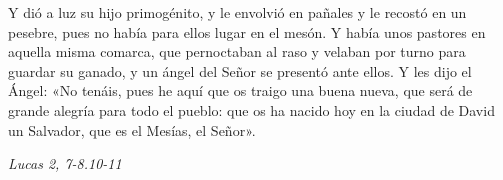 \documentclass[../../devocionario.tex]{subfiles}
\begin{document}
    Y dió a luz su hijo primogénito, y le envolvió en pañales y le recostó en un pesebre, pues no había para ellos lugar en el mesón. 
    Y había unos pastores en aquella misma comarca, que pernoctaban al raso y velaban por turno para guardar su ganado, 
    y un ángel del  Señor se presentó ante ellos. Y les dijo el Ángel: «No tenáis, pues he aquí que os traigo una buena nueva, 
    que será de grande alegría para todo el pueblo: que os ha nacido hoy en la ciudad de David un Salvador, que es el Mesías, el Señor».

    \begin{flushright}
        \textit{Lucas 2, 7-8.10-11}
    \end{flushright}
\end{document}
